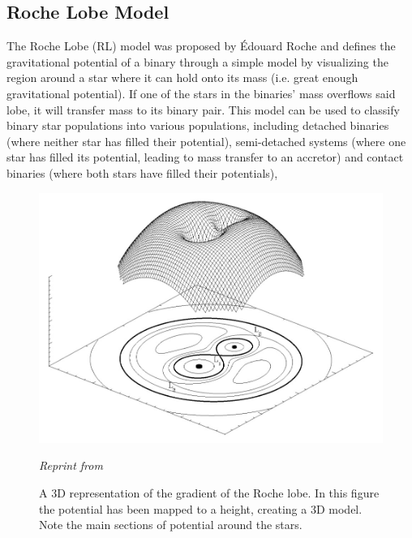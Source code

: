 \documentclass[12pt, a4paper]{article}
\begin{document}
    \subsection{Roche Lobe Model} \label{RLModel} %
        The Roche Lobe (RL) model was proposed by Édouard Roche and defines the gravitational potential of a binary through a simple model by visualizing the region around a star where it can hold onto its mass (i.e. great enough gravitational potential). If one of the stars in the binaries' mass overflows said lobe, it will transfer mass to its binary pair. This model can be used to classify binary star populations into various populations, including detached binaries (where neither star has filled their potential), semi-detached systems (where one star has filled its potential, leading to mass transfer to an accretor) and contact binaries (where both stars have filled their potentials), 

    \vspace*{\fill}
    \begin{figure}[H]
        \centering
        \includegraphics[width=\textwidth]{figs/reused-figs/Wiki-RochePotential.jpg}
        \caption{ A 3D representation of the gradient of the Roche lobe. In this figure the potential has been mapped to a height, creating a 3D model. Note the main sections of potential around the stars.}
        \label{fig:Roche_potential}
        \textit{\small Reprint from \parencite{vandersluys2005}}
    \end{figure}
    \vspace*{\fill}
\end{document}
